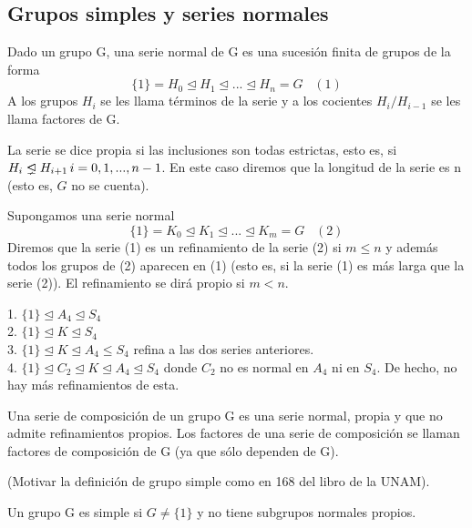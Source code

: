\subsection{Grupos simples y series normales}

\begin{definition}
Dado un grupo G, una serie normal de G es una sucesión finita de grupos de la forma $$\{1\} = H_0 \trianglelefteq H_1 \trianglelefteq ... \trianglelefteq H_n = G \;\;\;(1)$$ A los grupos $H_i$ se les llama términos de la serie y a los cocientes $H_i/H_{i-1}$ se les llama factores de G.

La serie se dice propia si las inclusiones son todas estrictas, esto es, si $H_i \propernormal H_{i+1} \, i = 0,1,...,n-1$. En este caso diremos que la longitud  de la serie es n (esto es, $G$ no se cuenta).

Supongamos una serie normal $$\{1\} = K_0 \trianglelefteq K_1 \trianglelefteq ... \trianglelefteq K_m = G\;\;\;(2)$$ Diremos que la serie (1) es un refinamiento de la serie (2) si $m \le n$ y además todos los grupos de (2) aparecen en (1) (esto es, si la serie (1) es más larga que la serie (2)). El refinamiento se dirá propio si $m < n$.
\end{definition}

\begin{example}
1. $\{1\} \trianglelefteq A_4 \trianglelefteq S_4$\\
2. $\{1\} \trianglelefteq K \trianglelefteq S_4$\\
3. $\{1\} \trianglelefteq K \trianglelefteq A_4 \le S_4$ refina a las dos series anteriores.\\
4. $\{1\} \trianglelefteq C_2 \trianglelefteq K \trianglelefteq A_4 \trianglelefteq S_4$ donde $C_2$ no es normal en $A_4$ ni en $S_4$. De hecho, no hay más refinamientos de esta.
\end{example}

\begin{definition}
Una serie de composición de un grupo G es una serie normal, propia y que no admite refinamientos propios. Los factores de una serie de composición se llaman factores de composición de G (ya que sólo dependen de G).
\end{definition}

(Motivar la definición de grupo simple como en 168 del libro de la UNAM).

\begin{definition}
Un grupo G es simple si $G \neq \{1\}$ y no tiene subgrupos normales propios.
\end{definition}

